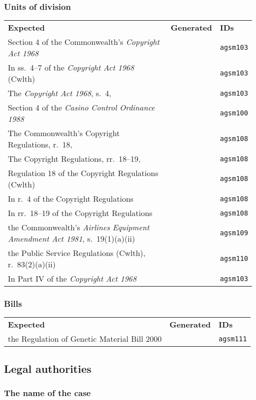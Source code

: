 \documentclass[a4paper,landscape,12pt]{article}
\newlength\q
\newlength\qr
\newenvironment{citetable}
  {\noindent\begin{longtable}{p{\q} p{\q} p{\qr}}\textbf{Expected} & \textbf{Generated} & \textbf{IDs}\\}
  {\end{longtable}}
\begin{document}
\subsubsection{Units of division}

\begin{citetable}
	Section 4 of the Commonwealth's \textit{Copyright Act 1968} & & \texttt{agsm103} \\
	In ss.~4--7 of the \textit{Copyright Act 1968} (Cwlth) & & \texttt{agsm103} \\
	The \textit{Copyright Act 1968}, s.~4, \textellipsis{} & & \texttt{agsm103} \\
	Section 4 of the \textit{Casino Control Ordinance 1988} & & \texttt{agsm100} \\
	The Commonwealth's Copyright Regulations, r.~18, \textellipsis{} & & \texttt{agsm108} \\
	The Copyright Regulations, rr.~18--19, \textellipsis{} & & \texttt{agsm108} \\
	Regulation 18 of the Copyright Regulations (Cwlth) & & \texttt{agsm108} \\
	In r.~4 of the Copyright Regulations & & \texttt{agsm108} \\
	In rr.~18--19 of the Copyright Regulations & & \texttt{agsm108} \\
	the Commonwealth's \textit{Airlines Equipment Amendment Act 1981}, s.~19(1)(a)(ii) & & \texttt{agsm109} \\
	the Public Service Regulations (Cwlth), r.~83(2)(a)(ii) & & \texttt{agsm110} \\
	In Part IV of the \textit{Copyright Act 1968} & & \texttt{agsm103} \\
\end{citetable}

\subsubsection{Bills}

\begin{citetable}
	the Regulation of Genetic Material Bill 2000 & & \texttt{agsm111} \\
\end{citetable}

\subsection{Legal authorities}

\subsubsection{The name of the case}
\end{document}
